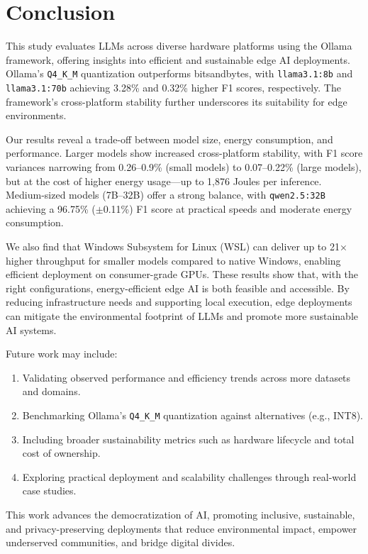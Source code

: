 \documentclass[conference]{IEEEtran}
\begin{document}

\section{Conclusion}

This study evaluates LLMs across diverse hardware platforms using the Ollama framework, offering insights into efficient and sustainable edge AI deployments. Ollama’s \texttt{Q4\_K\_M} quantization outperforms bitsandbytes, with \texttt{llama3.1:8b} and \texttt{llama3.1:70b} achieving 3.28\% and 0.32\% higher F1 scores, respectively. The framework’s cross-platform stability further underscores its suitability for edge environments.

Our results reveal a trade-off between model size, energy consumption, and performance. Larger models show increased cross-platform stability, with F1 score variances narrowing from 0.26–0.9\% (small models) to 0.07–0.22\% (large models), but at the cost of higher energy usage—up to 1,876 Joules per inference. Medium-sized models (7B–32B) offer a strong balance, with \texttt{qwen2.5:32B} achieving a 96.75\% ($\pm$0.11\%) F1 score at practical speeds and moderate energy consumption.

We also find that Windows Subsystem for Linux (WSL) can deliver up to 21× higher throughput for smaller models compared to native Windows, enabling efficient deployment on consumer-grade GPUs. These results show that, with the right configurations, energy-efficient edge AI is both feasible and accessible. By reducing infrastructure needs and supporting local execution, edge deployments can mitigate the environmental footprint of LLMs and promote more sustainable AI systems.

Future work may include:
\begin{enumerate}
    \item Validating observed performance and efficiency trends across more datasets and domains.
    \item Benchmarking Ollama’s \texttt{Q4\_K\_M} quantization against alternatives (e.g., INT8).
    \item Including broader sustainability metrics such as hardware lifecycle and total cost of ownership.
    \item Exploring practical deployment and scalability challenges through real-world case studies.
\end{enumerate}

This work advances the democratization of AI, promoting inclusive, sustainable, and privacy-preserving deployments that reduce environmental impact, empower underserved communities, and bridge digital divides.



\end{document}
